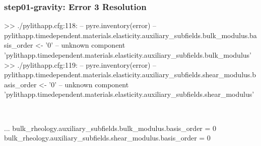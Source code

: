 \documentclass[aspectratio=169]{beamer}
\begin{document}
\begin{frame}[t,fragile]
  \frametitle{{\ttfamily step01-gravity}: Error 3 Resolution}

  \tserror
  \begin{bashcode}
 >> ./pylithapp.cfg:118:
 -- pyre.inventory(error)
 -- pylithapp.timedependent.materials.elasticity.auxiliary_subfields.bulk_modulus.basis_order <- '0'
 -- unknown component 'pylithapp.timedependent.materials.elasticity.auxiliary_subfields.bulk_modulus'
 >> ./pylithapp.cfg:119:
 -- pyre.inventory(error)
 -- pylithapp.timedependent.materials.elasticity.auxiliary_subfields.shear_modulus.basis_order <- '0'
 -- unknown component 'pylithapp.timedependent.materials.elasticity.auxiliary_subfields.shear_modulus'
  \end{bashcode}

  \pause\\[1pt]

  \begin{cfgcode}
    ...
    bulk_rheology.auxiliary_subfields.bulk_modulus.basis_order = 0
    bulk_rheology.auxiliary_subfields.shear_modulus.basis_order = 0
  \end{cfgcode}

\end{frame}
\end{document}
